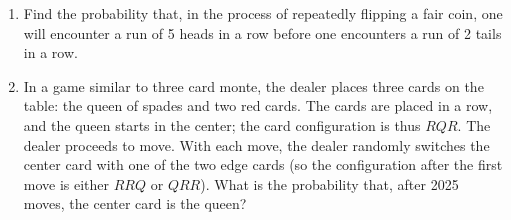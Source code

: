 \documentclass[10pt, oneside]{article}
\theoremstyle{definition}
\begin{document}
\begin{enumerate}
    \item Find the probability that, in the process of repeatedly flipping a fair coin, one will encounter a run of 5 heads in a row before one encounters a run of 2 tails in a row.
    \begin{solution}
        
    \end{solution}

    \item In a game similar to three card monte, the dealer places three cards on the table: the queen of spades and two red cards. The cards are placed in a row, and the queen starts in the center; the card configuration is thus $RQR$. The dealer proceeds to move. With each move, the dealer randomly switches the center card with one of the two edge cards (so the configuration after the first move is either $RRQ$ or $QRR$). What is the probability that, after 2025 moves, the center card is the queen?
\end{enumerate}



\newpage
\end{document}
